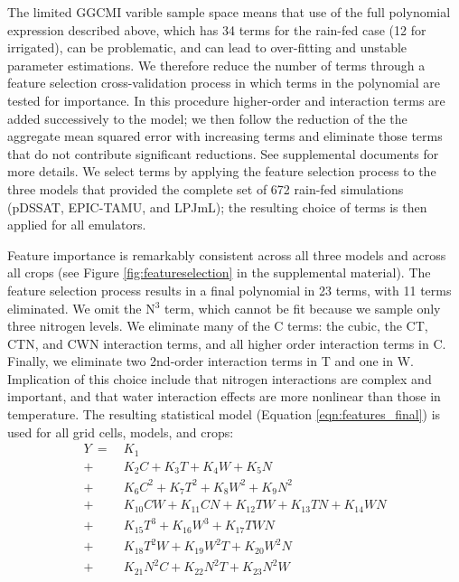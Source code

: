 \documentclass[preprint, 5p, times, twocolumn]{elsarticle}
\begin{document}
The limited GGCMI varible sample space means that use of the full polynomial expression described above, which has 34 terms for the rain-fed case (12 for irrigated), can be problematic, and can lead to over-fitting and unstable parameter estimations. We therefore reduce the number of terms through a feature selection cross-validation process in which terms in the polynomial are tested for importance. In this procedure higher-order and interaction terms are added successively to the model; we then follow the reduction of the the aggregate mean squared error with increasing terms and eliminate those terms that do not contribute significant reductions. See supplemental documents for more details. We select terms by applying the feature selection process to the three models that provided the complete set of 672 rain-fed simulations (pDSSAT, EPIC-TAMU, and LPJmL); the resulting choice of terms is then applied for all emulators. 

Feature importance is remarkably consistent across all three models and across all crops (see Figure \ref{fig:featureselection} in the supplemental material). The feature selection process results in a final polynomial in 23 terms, with 11 terms eliminated. We omit the N$^3$ term, which cannot be fit because we sample only three nitrogen levels. We eliminate many of the C terms: the cubic, the CT, CTN, and CWN interaction terms, and all higher order interaction terms in C.  Finally, we eliminate two 2nd-order interaction terms in T and one in W. Implication of this choice include that nitrogen interactions are complex and important, and that water interaction effects are more nonlinear than those in temperature. The resulting statistical model (Equation \ref{eqn:features_final}) is used for all grid cells, models, and crops: 
\begin{align}
    \label{eqn:features_final}
    Y\ = \ & K_{1}  \\
     + \ & K_{2} C + K_{3}T + K_{4} W + K_{5} N \nonumber \\
                  + \  & K_{6} C^2 + K_{7} T^2 + K_{8} W^2 + K_{9} N^2 \nonumber \\
                  + \ & K_{10} C W + K_{11} C N + K_{12} T W + K_{13} T N + K_{14} W N \nonumber \\ %
                 + \  & K_{15} T^3 + K_{16} W^3 + K_{17} T W N \nonumber \\ %
                 + \ & K_{18} T^{2} W + K_{19} W^2  T + K_{20} W^2 N \nonumber \\
          + \ &  K_{21} N^2 C + K_{22} N^2  T + K_{23} N^2 W \nonumber
\end{align}
\end{document}
